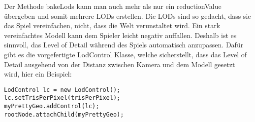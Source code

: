 Der Methode bakeLods kann man auch mehr als nur ein reductionValue übergeben und somit mehrere LODs erstellen. Die LODs sind so gedacht, dass sie das Spiel vereinfachen, nicht, dass die Welt verunstaltet wird. Ein stark vereinfachtes Modell kann dem Spieler leicht negativ auffallen. Deshalb ist es sinnvoll, das Level of Detail während des Spiels automatisch anzupassen. Dafür gibt es die vorgefertigte LodControl Klasse, welche sicherstellt, dass das Level of Detail ausgehend von der Distanz zwischen Kamera und dem Modell gesetzt wird, hier ein Beispiel:

\begin{lstlisting}
LodControl lc = new LodControl();
lc.setTrisPerPixel(trisPerPixel);
myPrettyGeo.addControl(lc);
rootNode.attachChild(myPrettyGeo);
\end{lstlisting}
\newpage

